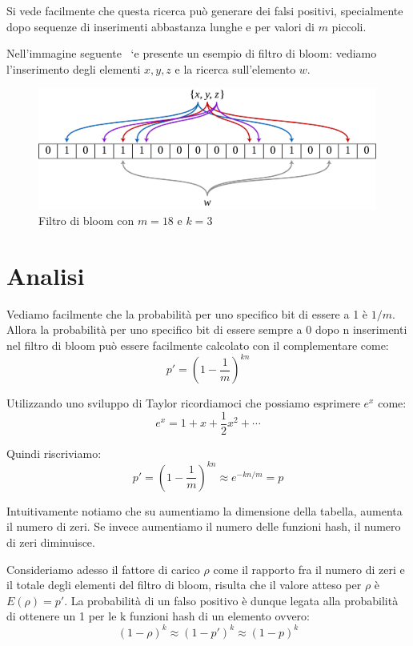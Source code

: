 \documentclass[a4paper,11pt]{book}
\begin{document}
Si vede facilmente che questa ricerca pu\`o generare dei falsi positivi, specialmente dopo sequenze di inserimenti abbastanza lunghe e per valori di $m$ piccoli.

Nell'immagine seguente \	`e presente un esempio di filtro di bloom: vediamo l'inserimento degli elementi $x, y, z$ e la ricerca sull'elemento $w$.

\begin{figure}
\centering
\includegraphics[height=4cm]{bloom.png}
\caption{Filtro di bloom con $m = 18$ e $k = 3$}
\end{figure}

\section{Analisi}

Vediamo facilmente che la probabilit\`a per uno specifico bit di essere a 1 \`e $1/m$. Allora la probabilit\`a per uno specifico bit di essere sempre a 0 dopo n inserimenti nel filtro di bloom pu\`o essere facilmente calcolato con il complementare come: $$p' = \left( 1 - \frac{1}{m}\right)^{kn}$$

Utilizzando uno sviluppo di Taylor ricordiamoci che possiamo esprimere $e^x$ come:$$e^x = 1 + x + \frac{1}{2}x^2 + \cdots$$

Quindi riscriviamo: $$p' = \left( 1 - \frac{1}{m}\right)^{kn} \approx e^{-kn/m} = p$$

Intuitivamente notiamo che su aumentiamo la dimensione della tabella, aumenta il numero di zeri. Se invece aumentiamo il numero delle funzioni hash, il numero di zeri diminuisce.

Consideriamo adesso il fattore di carico $\rho$ come il rapporto fra il numero di zeri e il totale degli elementi del filtro di bloom, risulta che il valore atteso per $\rho$ \`e $E(\rho) = p'$. La probabilit\`a di un falso positivo \`e dunque legata alla probabilit\`a di ottenere un 1 per le k funzioni hash di un elemento ovvero: $$(1 - \rho)^k \approx (1 - p')^k \approx (1 - p)^k$$
\end{document}
